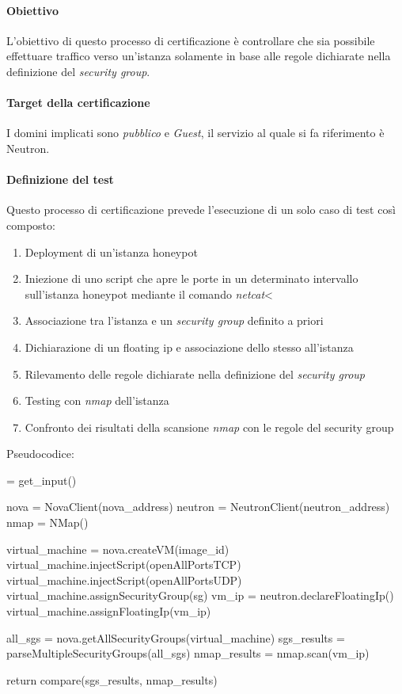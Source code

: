\documentclass[../main.tex]{subfiles}
\begin{document}
\paragraph{Obiettivo}
L'obiettivo di questo processo di certificazione è controllare che sia possibile effettuare traffico verso un'istanza solamente in base alle regole dichiarate nella definizione del \textit{security group}.

\paragraph{Target della certificazione}
I domini implicati sono \textit{pubblico} e \textit{Guest}, il servizio al quale si fa riferimento è Neutron.

\paragraph{Definizione del test}
Questo processo di certificazione prevede l'esecuzione di un solo caso di test così composto:
\begin{enumerate}
\item Deployment di un'istanza honeypot
\item Iniezione di uno script che apre le porte in un determinato intervallo sull'istanza honeypot mediante il comando \textit{netcat}<
\item Associazione tra l'istanza e un \textit{security group} definito a priori
\item Dichiarazione di un floating ip e associazione dello stesso all'istanza
\item Rilevamento delle regole dichiarate nella definizione del \textit{security group}
\item Testing con \textit{nmap} dell'istanza
\item Confronto dei risultati della scansione \textit{nmap} con le regole del security group
\end{enumerate}

Pseudocodice:

\begin{python}
 = get_input()

nova = NovaClient(nova_address)
neutron = NeutronClient(neutron_address)
nmap = NMap()

virtual_machine = nova.createVM(image_id)
virtual_machine.injectScript(openAllPortsTCP)
virtual_machine.injectScript(openAllPortsUDP)
virtual_machine.assignSecurityGroup(sg)
vm_ip = neutron.declareFloatingIp()
virtual_machine.assignFloatingIp(vm_ip)

all_sgs = nova.getAllSecurityGroups(virtual_machine)
sgs_results = parseMultipleSecurityGroups(all_sgs)
nmap_results = nmap.scan(vm_ip)

return compare(sgs_results, nmap_results)
\end{python}
\end{document}
